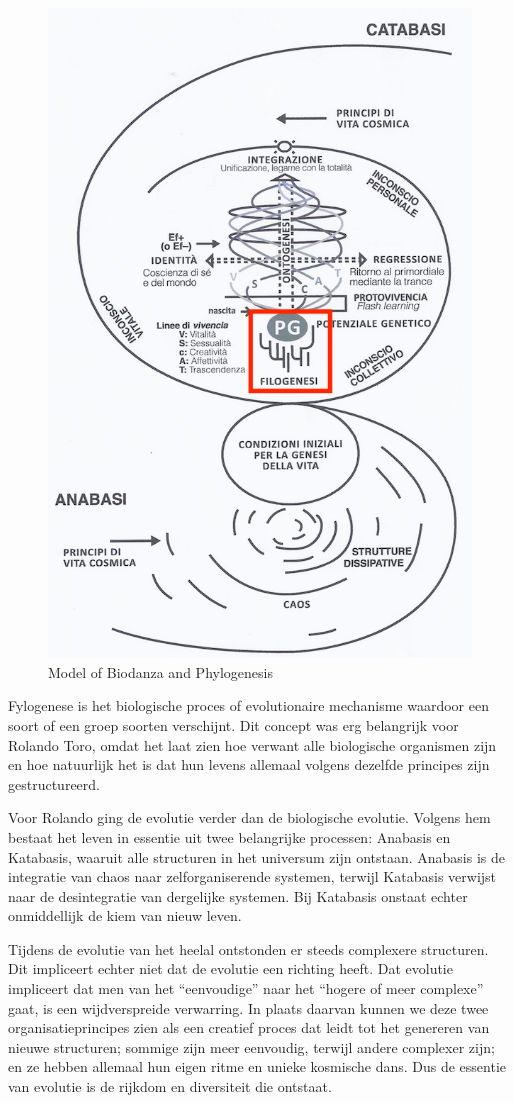 \documentclass[
  11pt,
]{book}
\begin{document}
\begin{figure}

{\centering \includegraphics[width=0.5\linewidth]{./figs/biologischeAspectenBiodanzaDeelII} 

}

\caption{Model of Biodanza and Phylogenesis}\label{fig:modelPhylo}
\end{figure}

Fylogenese is het biologische proces of evolutionaire mechanisme waardoor een soort of een groep soorten verschijnt. Dit concept was erg belangrijk voor Rolando Toro, omdat het laat zien hoe verwant alle biologische organismen zijn en hoe natuurlijk het is dat hun levens allemaal volgens dezelfde principes zijn gestructureerd.

Voor Rolando ging de evolutie verder dan de biologische evolutie. Volgens hem bestaat het leven in essentie uit twee belangrijke processen: Anabasis en Katabasis, waaruit alle structuren in het universum zijn ontstaan. Anabasis is de integratie van chaos naar zelforganiserende systemen, terwijl Katabasis verwijst naar de desintegratie van dergelijke systemen. Bij Katabasis onstaat echter onmiddellijk de kiem van nieuw leven.

Tijdens de evolutie van het heelal ontstonden er steeds complexere structuren. Dit impliceert echter niet dat de evolutie een richting heeft. Dat evolutie impliceert dat men van het ``eenvoudige'' naar het ``hogere of meer complexe'' gaat, is een wijdverspreide verwarring. In plaats daarvan kunnen we deze twee organisatieprincipes zien als een creatief proces dat leidt tot het genereren van nieuwe structuren; sommige zijn meer eenvoudig, terwijl andere complexer zijn; en ze hebben allemaal hun eigen ritme en unieke kosmische dans. Dus de essentie van evolutie is de rijkdom en diversiteit die ontstaat.
\end{document}
